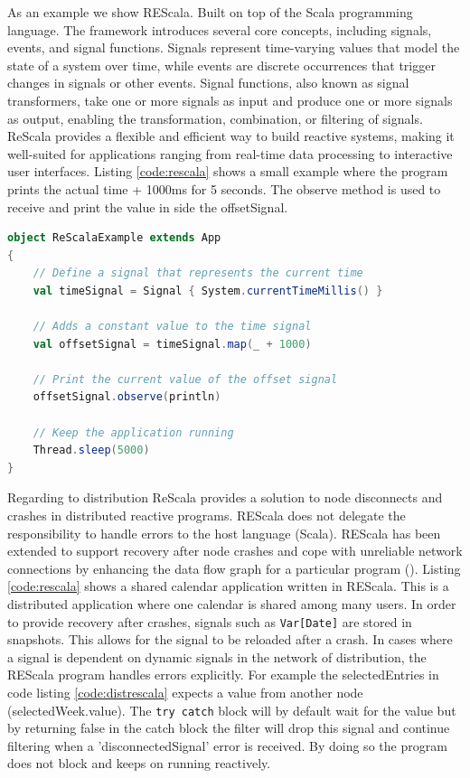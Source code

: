 \documentclass[a4paper]{book}
\begin{document}
As an example we show REScala. Built on top of the Scala programming language. The framework introduces several core concepts, including signals, events, and signal functions. Signals represent time-varying values that model the state of a system over time, while events are discrete occurrences that trigger changes in signals or other events. Signal functions, also known as signal transformers, take one or more signals as input and produce one or more signals as output, enabling the transformation, combination, or filtering of signals. ReScala provides a flexible and efficient way to build reactive systems, making it well-suited for applications ranging from real-time data processing to interactive user interfaces. Listing \ref{code:rescala} shows a small example where the program prints the actual time + 1000ms for 5 seconds. The observe method is used to receive and print the value in side the offsetSignal.

\newpage

\begin{lstlisting}[language=Scala, caption={REScala, time + 1000},captionpos=b, label={code:rescala}, basicstyle=\small\ttfamily, frame=single]
object ReScalaExample extends App
{
	// Define a signal that represents the current time
	val timeSignal = Signal { System.currentTimeMillis() }
		
	// Adds a constant value to the time signal
	val offsetSignal = timeSignal.map(_ + 1000)
		
	// Print the current value of the offset signal
	offsetSignal.observe(println)
		
	// Keep the application running
	Thread.sleep(5000)
}
\end{lstlisting}

 Regarding to distribution ReScala provides a solution to node disconnects and crashes in distributed reactive programs. REScala does not delegate the responsibility to handle errors to the host language (Scala). REScala has been extended to support recovery after node crashes and cope with unreliable network connections by enhancing the data flow graph for a particular program (\cite{DBLP:conf/ecoop/MogkBSFM18}). Listing \ref{code:rescala} shows a shared calendar application written in REScala. This is a distributed application where one calendar is shared among many users. In order to provide recovery after crashes, signals such as \texttt{Var[Date]} are stored in snapshots. This allows for the signal to be reloaded after a crash. In cases where a signal is dependent on dynamic signals in the network of distribution, the REScala program handles errors explicitly. For example the selectedEntries in code listing \ref{code:distrescala} expects a value from another node (selectedWeek.value). The \texttt{try catch} block will by default wait for the value but by returning false in the catch block the filter will drop this signal and continue filtering when a 'disconnectedSignal' error is received. By doing so the program does not block and keeps on running reactively.  
 
\end{document}
